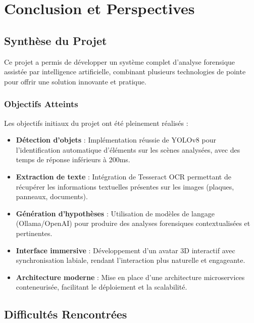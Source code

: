 \chapter{Conclusion et Perspectives}
\label{chap:conclusion}

\section{Synthèse du Projet}

Ce projet a permis de développer un système complet d'analyse forensique assistée par intelligence artificielle, combinant plusieurs technologies de pointe pour offrir une solution innovante et pratique.

\subsection{Objectifs Atteints}

Les objectifs initiaux du projet ont été pleinement réalisés :

\begin{itemize}
    \item \textbf{Détection d'objets} : Implémentation réussie de YOLOv8 pour l'identification automatique d'éléments sur les scènes analysées, avec des temps de réponse inférieurs à 200ms.
    
    \item \textbf{Extraction de texte} : Intégration de Tesseract OCR permettant de récupérer les informations textuelles présentes sur les images (plaques, panneaux, documents).
    
    \item \textbf{Génération d'hypothèses} : Utilisation de modèles de langage (Ollama/OpenAI) pour produire des analyses forensiques contextualisées et pertinentes.
    
    \item \textbf{Interface immersive} : Développement d'un avatar 3D interactif avec synchronisation labiale, rendant l'interaction plus naturelle et engageante.
    
    \item \textbf{Architecture moderne} : Mise en place d'une architecture microservices conteneurisée, facilitant le déploiement et la scalabilité.
\end{itemize}

\section{Difficultés Rencontrées}

